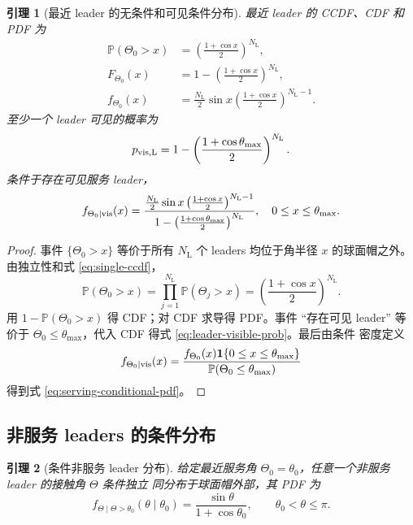 \documentclass[UTF8,a4paper,11pt]{ctexart}
\newtheorem{lemma}{引理}[section]
\newcommand{\Prob}{\mathbb P}
\newcommand{\ind}{\mathbf 1}
\newcommand{\NL}{N_{\mathrm L}}
\newcommand{\thetam}{\theta_{\max}}
\begin{document}
\begin{lemma}[最近 leader 的无条件和可见条件分布]
最近 leader 的 CCDF、CDF 和 PDF 为
\begin{align}
 \Prob(\Theta_0>x)
 &=\left(\frac{1+\cos x}{2}\right)^{\NL},\label{eq:nearest-ccdf}\\
 F_{\Theta_0}(x)
 &=1-\left(\frac{1+\cos x}{2}\right)^{\NL},\label{eq:nearest-cdf}\\
 f_{\Theta_0}(x)
 &=\frac{\NL}{2}\sin x
 \left(\frac{1+\cos x}{2}\right)^{\NL-1}.
 \label{eq:nearest-pdf}
\end{align}
至少一个 leader 可见的概率为
\begin{equation}
 p_{\rm vis,L}
 =1-\left(\frac{1+\cos\thetam}{2}\right)^{\NL}.
 \label{eq:leader-visible-prob}
\end{equation}
条件于存在可见服务 leader，
\begin{equation}
 f_{\Theta_0\mid{\rm vis}}(x)
 =
 \frac{
 \frac{\NL}{2}\sin x
 \left(\frac{1+\cos x}{2}\right)^{\NL-1}
 }{
 1-\left(\frac{1+\cos\thetam}{2}\right)^{\NL}
 },
 \quad 0\leq x\leq\thetam.
 \label{eq:serving-conditional-pdf}
\end{equation}
\end{lemma}

\begin{proof}
事件 $\{\Theta_0>x\}$ 等价于所有 $\NL$ 个 leaders 均位于角半径 $x$ 的球面帽之外。
由独立性和式 \eqref{eq:single-ccdf}，
\begin{equation}
 \Prob(\Theta_0>x)
 =\prod_{j=1}^{\NL}\Prob(\Theta_j>x)
 =\left(\frac{1+\cos x}{2}\right)^{\NL}.
\end{equation}
用 $1-\Prob(\Theta_0>x)$ 得 CDF；对 CDF 求导得 PDF。事件 ``存在可见 leader''
等价于 $\Theta_0\leq\thetam$，代入 CDF 得式 \eqref{eq:leader-visible-prob}。最后由条件
密度定义
\begin{equation}
 f_{\Theta_0\mid{\rm vis}}(x)
 =\frac{f_{\Theta_0}(x)\ind\{0\leq x\leq\thetam\}}
 {\Prob(\Theta_0\leq\thetam)}
\end{equation}
得到式 \eqref{eq:serving-conditional-pdf}。
\end{proof}

\subsection{非服务 leaders 的条件分布}

\begin{lemma}[条件非服务 leader 分布]
\label{lem:nonserving}
给定最近服务角 $\Theta_0=\theta_0$，任意一个非服务 leader 的接触角 $\Theta$ 条件独立
同分布于球面帽外部，其 PDF 为
\begin{equation}
 f_{\Theta\mid\Theta>\theta_0}(\theta\mid\theta_0)
 =
 \frac{\sin\theta}{1+\cos\theta_0},
 \qquad \theta_0<\theta\leq\pi.
 \label{eq:nonserving-pdf}
\end{equation}
\end{lemma}
\end{document}
